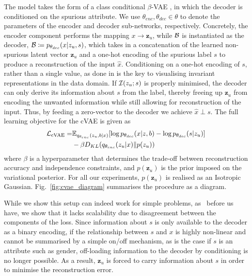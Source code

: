 The model takes the form of a class conditional $\beta$-VAE \citep{higgins2017beta}, in which the
decoder is conditioned on the spurious attribute. 
%
We use $\theta_{enc}, \theta_{dec} \in \theta$ to denote the parameters of the encoder and decoder
sub-networks, respectively. 
%
Concretely, the encoder component performs the mapping $x \to{\bm{z}_u}$, while ${\mathcal{B}}$ is
instantiated as the decoder, ${\mathcal{B}} \coloneqq p_{\theta_{dec}}(x|z_u, s)$, which takes in a
concatenation of the learned non-spurious latent vector $\bm{z}_u$ and a one-hot encoding of the
spurious label $s$ to produce a reconstruction of the input $\hat{x}$. 
%
Conditioning on a one-hot encoding of $s$, rather than a single value, as done in
\citet{madras2018learning} is the key to visualising invariant representations in the data domain.
%
If ${\mathcal{I}}(z_u; s)$ is properly minimised, the decoder can only derive its information about $s$ from
the label, thereby freeing up $\bm{z}_u$ from encoding the unwanted information while still
allowing for reconstruction of the input.
%
Thus, by feeding a zero-vector to the decoder we achieve $\hat{x} \perp s$. The full learning
objective for the cVAE is given as
%
\begin{align}
\begin{split}
    {\mathcal{L}}_{\mathrm{cVAE}} =& \mathbb{E}_{q_{\theta_{enc}}(z_u, b|x)}[\log
    p_{\theta_{dec}}(x|z, b) - \log p_{\theta_{dec}}(s|z_u)] \\ &- \beta
    D_{KL}(q_{\theta_{enc}}(z_u |x) \| p(z_u))
\end{split}
\end{align}
%
where $\beta$ is a hyperparameter that determines the trade-off between reconstruction accuracy and
independence constraints, and $p(\bm{z}_u)$ is the prior imposed on the variational posterior. 
%
For all our experiments, $p(\bm{z}_u)$ is realised as an Isotropic Gaussian.
Fig.~\ref{fig:cvae_diagram} summarises the procedure as a diagram.

While we show this setup can indeed work for simple problems, as~\citet{madras2018learning} before
us have, we show that it lacks scalability due to disagreement between the components of the loss.
%
Since information about $s$ is only available to the decoder as a binary encoding, if the
relationship between $s$ and $x$ is highly non-linear and cannot be summarised by a simple on/off
mechanism, as is the case if $s$ is an attribute such as gender, off-loading information to the
decoder by conditioning is no longer possible. 
%
As a result, $\bm{z}_u$ is forced to carry information about $s$ in order to minimise the
reconstruction error. 

